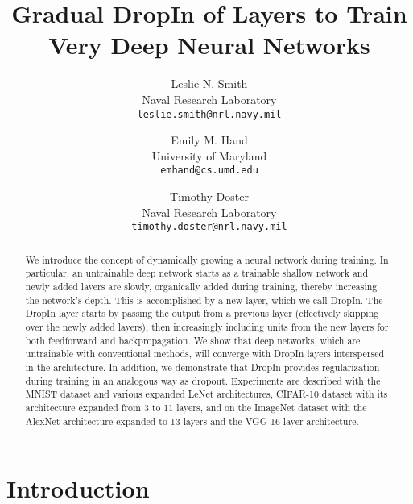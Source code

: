 \documentclass[10pt,twocolumn,letterpaper]{article}
\newcommand{\dropin}{DropIn }
\newcommand{\dropinNS}{DropIn}
\begin{document}
\title{Gradual DropIn of Layers to Train Very Deep Neural Networks}

\author{
Leslie N. Smith\\
Naval Research Laboratory\\
{\tt\small leslie.smith@nrl.navy.mil}\\
\and
Emily M. Hand\\
University of Maryland\\
{\tt\small emhand@cs.umd.edu}
\and
Timothy Doster\\
Naval Research Laboratory\\
{\tt\small timothy.doster@nrl.navy.mil}\\
}

\maketitle

\begin{abstract}


We introduce the concept of dynamically growing a neural network during training. In particular, an untrainable deep network starts as a trainable shallow network and newly added layers are slowly, organically added during training, thereby increasing the network's depth. This is accomplished by a new layer, which we call \dropinNS. The \dropin layer starts by passing the output from a previous layer (effectively skipping over the newly added layers), then increasingly including units from the new layers for both feedforward and backpropagation. We show that deep networks, which are untrainable with conventional methods, will converge with \dropin layers interspersed in the architecture. In addition, we demonstrate that \dropin provides regularization during training in an analogous way as dropout. Experiments are described with the MNIST dataset and various expanded LeNet architectures, CIFAR-10 dataset with its architecture expanded from 3 to 11 layers, and on the ImageNet dataset with the AlexNet architecture expanded to 13 layers and the VGG 16-layer architecture.

\end{abstract}

\section{Introduction}
\end{document}
